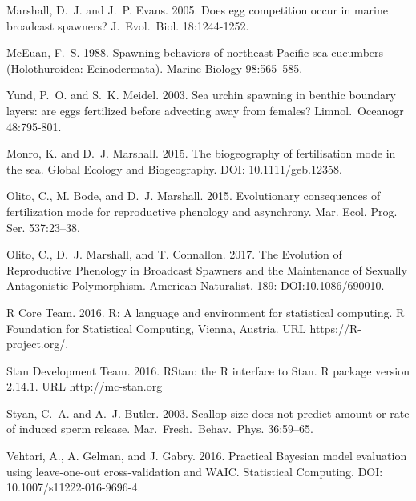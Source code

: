 \documentclass{article}
\begin{document}
\begin{thebibliography}{}
Marshall, D.~J. and J.~P. Evans. 2005.
\newblock Does egg competition occur in marine broadcast spawners? 
\newblock J.~Evol.~Biol. 18:1244-1252.

McEuan, F.~S. 1988.
\newblock Spawning behaviors of northeast Pacific sea cucumbers (Holothuroidea: Ecinodermata).
\newblock Marine Biology 98:565--585.

Yund, P.~O. and S.~K. Meidel. 2003.
\newblock Sea urchin spawning in benthic boundary layers: are eggs fertilized before advecting away from females?
\newblock Limnol.~Oceanogr 48:795-801.

Monro, K. and D.~J. Marshall. 2015.
\newblock The biogeography of fertilisation mode in the sea.
\newblock Global Ecology and Biogeography. DOI: 10.1111/geb.12358.

Olito, C., M. Bode, and D.~J. Marshall. 2015.
\newblock Evolutionary consequences of fertilization mode for reproductive phenology and asynchrony.
\newblock Mar. Ecol. Prog. Ser. 537:23--38.

Olito, C., D.~J. Marshall, and T. Connallon. 2017.
\newblock The Evolution of Reproductive Phenology in Broadcast Spawners and the Maintenance of Sexually Antagonistic Polymorphism.
\newblock American Naturalist. 189: DOI:10.1086/690010.

R Core Team. 2016.
\newblock R: A language and environment for statistical computing. 
\newblock R Foundation for Statistical Computing, Vienna, Austria. URL https://R-project.org/.

Stan Development Team. 2016.
\newblock RStan: the R interface to Stan.
\newblock R package version 2.14.1. URL http://mc-stan.org

Styan, C.~A. and A.~J. Butler. 2003.
\newblock Scallop size does not predict amount or rate of induced sperm release.
\newblock Mar.~Fresh.~Behav.~Phys. 36:59--65.

Vehtari, A., A. Gelman, and J. Gabry. 2016.
\newblock Practical Bayesian model evaluation using leave-one-out cross-validation and WAIC.
\newblock Statistical Computing. DOI: 10.1007/s11222-016-9696-4.


\end{thebibliography}

\newpage{}
\end{document}
